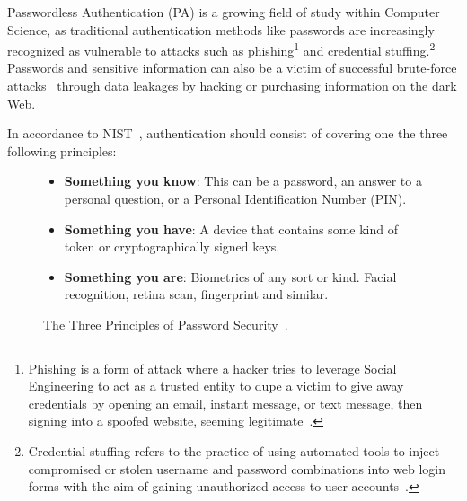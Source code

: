Passwordless Authentication (PA) is a growing field of study within Computer
Science, as traditional authentication methods like passwords are increasingly
recognized as vulnerable to attacks such as phishing\footnote{
  Phishing is a form of attack where a hacker tries to leverage Social
  Engineering to act as a trusted entity to dupe a victim to give away
  credentials by opening an email, instant message, or text message, then
  signing into a spoofed website, seeming legitimate~\cite{ripa2021emergence}.
} and credential stuffing.\footnote{
  Credential stuffing refers to the practice of using automated tools to
  inject compromised or stolen username and password combinations into web login
  forms with the aim of gaining unauthorized access to user
  accounts~\cite{owasp-credential-stuffing}.
}
Passwords and sensitive information can also be a victim of successful
brute-force attacks~\cite{bonneau2012science} through data leakages by hacking
or purchasing information on the dark Web.

In accordance to NIST~\cite{NIST:SP:800-171r2, NISTSP800-63-3}, authentication
should consist of covering one the three following principles:

\begin{figure}[htbp]
  \begin{itemize}
    \item \textbf{Something you know}:
      This can be a password, an answer to a personal question, or a Personal
      Identification Number (PIN).
    \item \textbf{Something you have}:
      A device that contains some kind of token or cryptographically signed keys.
    \item \textbf{Something you are}:
      Biometrics of any sort or kind.
    Facial recognition, retina scan, fingerprint and similar.
  \end{itemize}
  \caption{The Three Principles of Password Security~\cite{schneier2000secrets, NIST:SP:800-171r2}.}
  \label{fig:secprinciples}

\end{figure}

